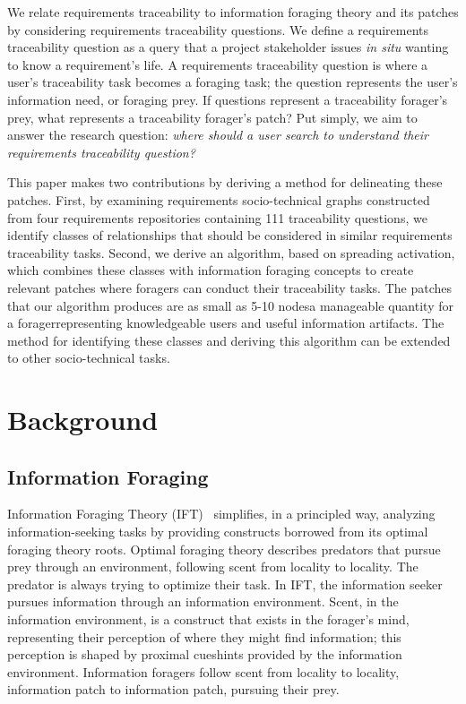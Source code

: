 \documentclass[conference]{IEEEtran}
\begin{document}
We relate requirements traceability to information foraging theory and its patches by considering requirements traceability questions. We define a requirements traceability question as a query that a project stakeholder issues \textit{in situ} wanting to know a requirement's life. A requirements traceability question is where a user's traceability task becomes a foraging task; the question represents the user's information need, or foraging prey. If questions represent a traceability forager's prey, what represents a traceability forager's patch? Put simply, we aim to answer the research question: \textit{where should a user search to understand their requirements traceability question?}

This paper makes two contributions by deriving a method for delineating these patches. First, by examining requirements socio-technical graphs constructed from four requirements repositories containing 111 traceability questions, we identify classes of relationships that should be considered in similar requirements traceability tasks. Second, we derive an algorithm, based on spreading activation, which combines these classes with information foraging concepts to create relevant patches where foragers can conduct their traceability tasks. The patches that our algorithm produces are as small as 5-10 nodes\textemdash a manageable quantity for a forager\textemdash representing knowledgeable users and useful information artifacts. The method for identifying these classes and deriving this algorithm can be extended to other socio-technical tasks.

\section{Background}

\subsection{Information Foraging}
Information Foraging Theory (IFT)~\cite{pirolli07} simplifies, in a principled way, analyzing information-seeking tasks by providing constructs borrowed from its optimal foraging theory roots. Optimal foraging theory describes predators that pursue prey through an environment, following scent from locality to locality. The predator is always trying to optimize their task. In IFT, the information seeker pursues information through an information environment. Scent, in the information environment, is a construct that exists in the forager's mind, representing their perception of where they might find information; this perception is shaped by proximal cues\textemdash hints provided by the information environment. Information foragers follow scent from locality to locality, information patch to information patch, pursuing their prey. 
\end{document}
